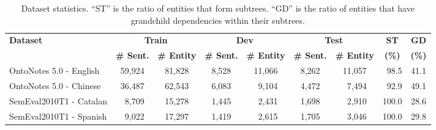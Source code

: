 \begin{table}[t!]
	\centering
	\setlength{\tabcolsep}{2pt} %
	\renewcommand{\arraystretch}{1.1} %
		\begin{tabular}{l cccccccc}
			\toprule
			\multirow{2}{*}{\textbf{Dataset}} & \multicolumn{2}{c}{\bf Train} & \multicolumn{2}{c}{\bf Dev} & \multicolumn{2}{c}{\bf Test} & \textbf{ST} & \textbf{GD} \\[-1mm]
			\cmidrule(lr){2-3} \cmidrule(lr){4-5} \cmidrule(lr){6-7}
			& \textbf{\# Sent.} & \textbf{\# Entity} & \textbf{\# Sent.} & \textbf{\# Entity} & \textbf{\# Sent.} & \textbf{\# Entity} & \textbf{(\%)} & \textbf{(\%)} \\
			\midrule
			OntoNotes 5.0 - English & 59,924 & 81,828 & 8,528 & 11,066 & 8,262 & 11,057 & \textcolor{white}{0}98.5 & 41.1  \\
			OntoNotes 5.0 - Chinese & 36,487 & 62,543 & 6,083 & \textcolor{white}{0}9,104 & 4,472 & \textcolor{white}{0}7,494 & \textcolor{white}{0}92.9 & 49.1\\
			SemEval2010T1 - Catalan & \textcolor{white}{0}8,709 & 15,278 & 1,445 & \textcolor{white}{0}2,431 & 1,698 & \textcolor{white}{0}2,910 & 100.0 & 28.6 \\
			SemEval2010T1 - Spanish  & \textcolor{white}{0}9,022 & 17,297 & 1,419 & \textcolor{white}{0}2,615 & 1,705 & \textcolor{white}{0}3,046 & 100.0 & 29.8\\
			\bottomrule
		\end{tabular}
	\caption{Dataset statistics. ``ST'' is the ratio of entities that form subtrees. ``GD'' is the ratio of entities that have grandchild dependencies within their subtrees.}
	\label{tab:datastat}
\end{table}




